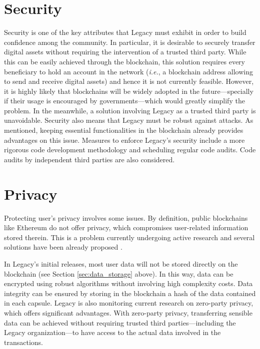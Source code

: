 \section{Security} %
\label{sub:security}
Security is one of the key attributes that Legacy must exhibit in order to build confidence among the community. 
In particular, it is desirable to securely transfer digital assets without requiring the intervention of a trusted third party. 
While this can be easily achieved through the blockchain, this solution requires every beneficiary to hold an account in the network (\textit{i.e.}, a blockchain address allowing to send and receive digital assets) and hence it is not currently feasible.
However, it is highly likely that blockchains will be widely adopted in the future---specially if their usage is encouraged by governments---which would greatly simplify the problem.
In the meanwhile, a solution involving Legacy as a trusted third party is unavoidable.
Security also means that Legacy must be robust against attacks. As mentioned, keeping essential functionalities in the blockchain already provides advantages on this issue. Measures to enforce Legacy's security include a more rigorous code development methodology and scheduling regular code audits. Code audits by independent third parties are also considered.


\section{Privacy} %
\label{sub:privacy}
Protecting user's privacy involves some issues. By definition, public blockchains like Ethereum do not offer privacy, which compromises user-related information stored therein. This is a problem currently undergoing active research and several solutions have been already proposed \cite{Buterin, deep}. 

In Legacy's initial releases, most user data will not be stored directly on the blockchain (see Section \ref{sec:data_storage} above). In this way, data can be encrypted using robust algorithms without involving high complexity costs. Data integrity can be ensured by storing in the blockchain a hash of the data contained in each capsule.
Legacy is also monitoring current research on zero-party privacy, which offers significant advantages. With zero-party privacy, transferring sensible data can be achieved without requiring trusted third parties---including the Legacy organization---to have access to the actual data involved in the transactions.

